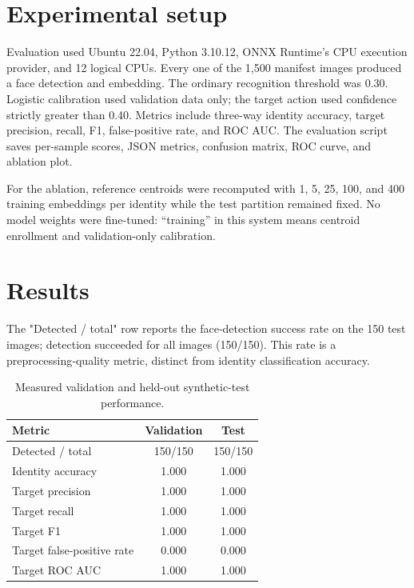 \documentclass{article}
\begin{document}
\section{Experimental setup}

Evaluation used Ubuntu 22.04, Python 3.10.12, ONNX Runtime's CPU execution provider, and 12 logical CPUs. Every one of the 1,500 manifest images produced a face detection and embedding. The ordinary recognition threshold was 0.30. Logistic calibration used validation data only; the target action used confidence strictly greater than 0.40. Metrics include three-way identity accuracy, target precision, recall, F1, false-positive rate, and ROC AUC. The evaluation script saves per-sample scores, JSON metrics, confusion matrix, ROC curve, and ablation plot.

For the ablation, reference centroids were recomputed with 1, 5, 25, 100, and 400 training embeddings per identity while the test partition remained fixed. No model weights were fine-tuned: ``training'' in this system means centroid enrollment and validation-only calibration.

\section{Results}
The "Detected / total" row reports the face‑detection success rate on the 150 test images; detection succeeded for all images (150/150). This rate is a preprocessing‑quality metric, distinct from identity classification accuracy.
\begin{table}[t]
  \caption{Measured validation and held-out synthetic-test performance.}
  \label{tab:metrics}
  \centering
  \begin{tabular}{lcc}
    \toprule
    Metric & Validation & Test \\
    \midrule
    Detected / total & 150/150 & 150/150 \\
    Identity accuracy & 1.000 & 1.000 \\
    Target precision & 1.000 & 1.000 \\
    Target recall & 1.000 & 1.000 \\
    Target F1 & 1.000 & 1.000 \\
    Target false-positive rate & 0.000 & 0.000 \\
    Target ROC AUC & 1.000 & 1.000 \\
    \bottomrule
  \end{tabular}
\end{table}
\end{document}
